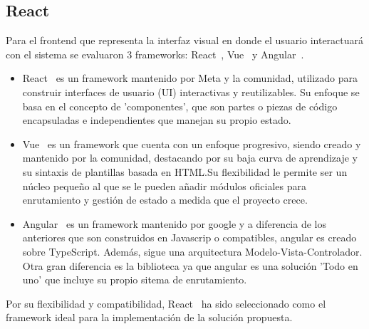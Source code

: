 ﻿\documentclass{iccmemoria}
\begin{document}
    \subsection{React}
    Para el frontend que representa la interfaz visual en donde el usuario interactuará con el sistema se evaluaron 3 frameworks: React~\cite{react}, Vue~\cite{vue} y Angular~\cite{angular}.\\
    \begin{itemize}
        \item React~\cite{react} es un framework mantenido por Meta y la comunidad, utilizado para construir interfaces de usuario (UI) interactivas y reutilizables. Su enfoque se basa en el concepto de 'componentes', que son partes o piezas de código encapsuladas e independientes que manejan su propio estado.
        \item Vue~\cite{vue} es un framework que cuenta con un enfoque progresivo, siendo creado y mantenido por la comunidad, destacando por su baja curva de aprendizaje y su sintaxis de plantillas basada en HTML.Su flexibilidad le permite ser un núcleo pequeño al que se le pueden añadir módulos oficiales para enrutamiento y gestión de estado a medida que el proyecto crece.
        \item Angular~\cite{angular} es un framework mantenido por google  y a diferencia de los anteriores que son construidos en Javascrip o compatibles, angular es creado sobre TypeScript. Además, sigue una arquitectura Modelo-Vista-Controlador. Otra gran diferencia es la biblioteca ya que angular es una solución 'Todo en uno' que incluye su propio sitema de enrutamiento.
    \end{itemize}
    
    Por su flexibilidad y compatibilidad, React~\cite{react} ha sido seleccionado como el framework ideal para la implementación de la solución propuesta.
\end{document}
